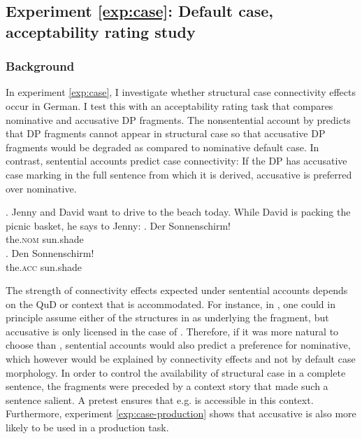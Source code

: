 \label{exp:case}
\subsection{Experiment \ref{exp:case}: Default case, acceptability rating study} \label{sec:fragments-case-rating}


\subsubsection{Background}
\label{sec:fragments-case-background}

In experiment \ref{exp:case}, I investigate whether structural case connectivity effects occur in German. I test this with an acceptability rating task that compares nominative \Next[a] and accusative \Next[b] DP fragments. The nonsentential account by \citet{barton.progovac2005} predicts that DP fragments cannot appear in structural case so that accusative DP fragments would be degraded as compared to nominative default case. In contrast, sentential accounts predict case connectivity: If the DP has accusative case marking in the full sentence from which it is derived, accusative is preferred over nominative.

\ex. Jenny and David want to drive to the beach today. While David is packing the picnic basket, he says to Jenny:\label{ex:case-sample-item}
\ag. Der Sonnenschirm!\\ 
the.\textsc{nom} sun.shade\\
\bg. Den Sonnenschirm!\\
the.\textsc{acc} sun.shade\\

The strength of connectivity effects expected under sentential accounts depends on the QuD or context that is accommodated. For instance, in \Last, one could in principle assume either of the structures in \Next as underlying the fragment, but accusative is only licensed in the case of \Next[a]. Therefore, if it was more natural to choose \Next[b] than \Next[a], sentential accounts would also predict a preference for nominative, which however would be explained by connectivity effects and not by default case morphology. In order to control the availability of structural case in a complete sentence, the fragments were preceded by a context story that made such a sentence salient. A pretest ensures that e.g. \Next[a] is accessible in this context. Furthermore, experiment \ref{exp:case-production} shows that accusative is also more likely to be used in a production task.
 
